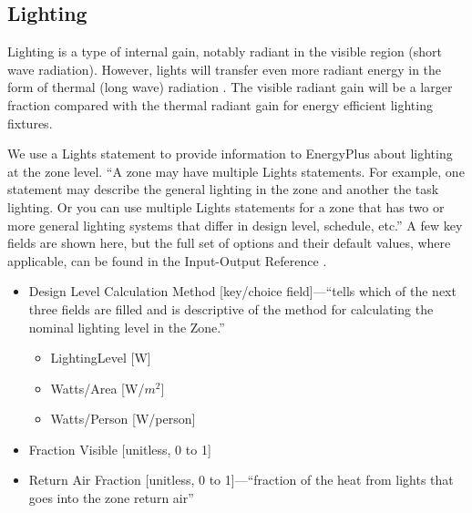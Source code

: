 \documentclass[10pt]{article}
\begin{document}
\subsection{Lighting}

Lighting is a type of internal gain, notably radiant in the visible region (short wave radiation). However, lights will transfer even more radiant energy in the form of thermal (long wave) radiation \cite{EPdocs9engineering}. The visible radiant gain will be a larger fraction compared with the thermal radiant gain for energy efficient lighting fixtures.

We use a Lights statement to provide information to EnergyPlus about lighting at the zone level. ``A zone may have multiple Lights statements. For example, one statement may describe the general
lighting in the zone and another the task lighting. Or you can use multiple Lights statements for a zone
that has two or more general lighting systems that differ in design level, schedule, etc.'' \cite{EPdocs9inputoutput} A few key fields are shown here, but the full set of options and their default values, where applicable, can be found in the Input-Output Reference \cite{EPdocs9inputoutput}.

\begin{itemize}
    \setlength{\itemsep}{0pt}%
    \setlength{\parskip}{0pt}%
\item Design Level Calculation Method [key/choice field]---``tells which of the next three fields are filled and is descriptive of
the method for calculating the nominal lighting level in the Zone.'' \cite{EPdocs9inputoutput}
\begin{itemize}
    \setlength{\itemsep}{0pt}%
    \setlength{\parskip}{0pt}%
    \item LightingLevel [W]
    \item Watts/Area [W/$m^2$]
    \item Watts/Person [W/person]
\end{itemize}
\item Fraction Visible [unitless, 0 to 1]
\item Return Air Fraction [unitless, 0 to 1]---``fraction of the heat from lights that goes into the zone return air'' \cite{EPdocs9inputoutput}
\end{itemize}
\vspace{-6pt}


\end{document}
